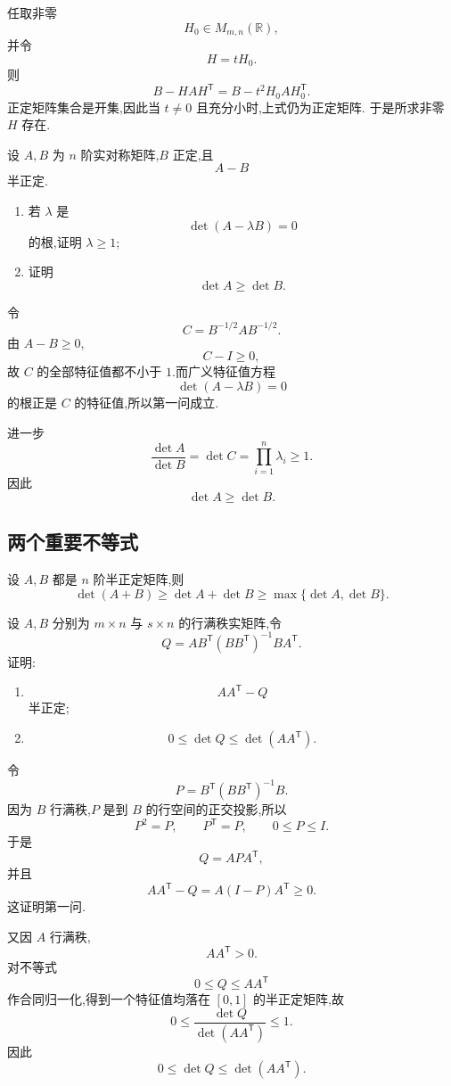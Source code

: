 \begin{solution}
任取非零
\[
H_0\in M_{m,n}(\mathbb{R}),
\]
并令
\[
H=tH_0.
\]
则
\[
B-HAH^{\mathsf T}
=
B-t^2H_0AH_0^{\mathsf T}.
\]
正定矩阵集合是开集,因此当 $t\neq0$ 且充分小时,上式仍为正定矩阵.
于是所求非零 $H$ 存在.
\end{solution}


\begin{example}
设 $A,B$ 为 $n$ 阶实对称矩阵,$B$ 正定,且
\[
A-B
\]
半正定.
\begin{enumerate}
    \item 若 $\lambda$ 是
    \[
    \det(A-\lambda B)=0
    \]
    的根,证明 $\lambda\ge1$;
    \item 证明
    \[
    \det A\ge\det B.
    \]
\end{enumerate}
\end{example}
\exampleblank

\begin{solution}
令
\[
C=B^{-1/2}AB^{-1/2}.
\]
由 $A-B\ge0$,
\[
C-I\ge0,
\]
故 $C$ 的全部特征值都不小于 $1$.而广义特征值方程
\[
\det(A-\lambda B)=0
\]
的根正是 $C$ 的特征值,所以第一问成立.

进一步
\[
\dfrac{\det A}{\det B}
=
\det C
=
\prod\limits_{i=1}^{n}\lambda_i
\ge1.
\]
因此
\[
\boxed{\det A\ge\det B}.
\]
\end{solution}


\subsection{两个重要不等式}

\begin{proposition}[\markstar]
设 $A,B$ 都是 $n$ 阶半正定矩阵,则
\[
\det(A+B)\ge\det A+\det B
\ge
\max\{\det A,\det B\}.
\]
\end{proposition}


\begin{example}
设 $A,B$ 分别为 $m\times n$ 与 $s\times n$ 的行满秩实矩阵,令
\[
Q=
AB^{\mathsf T}(BB^{\mathsf T})^{-1}BA^{\mathsf T}.
\]
证明:
\begin{enumerate}
    \item
    \[
    AA^{\mathsf T}-Q
    \]
    半正定;
    \item
    \[
    0\le\det Q\le\det(AA^{\mathsf T}).
    \]
\end{enumerate}
\end{example}
\exampleblank

\begin{solution}
令
\[
P=
B^{\mathsf T}(BB^{\mathsf T})^{-1}B.
\]
因为 $B$ 行满秩,$P$ 是到 $B$ 的行空间的正交投影,所以
\[
P^2=P,\qquad P^{\mathsf T}=P,\qquad 0\le P\le I.
\]
于是
\[
Q=APA^{\mathsf T},
\]
并且
\[
AA^{\mathsf T}-Q
=
A(I-P)A^{\mathsf T}\ge0.
\]
这证明第一问.

又因 $A$ 行满秩,
\[
AA^{\mathsf T}>0.
\]
对不等式
\[
0\le Q\le AA^{\mathsf T}
\]
作合同归一化,得到一个特征值均落在 $[0,1]$ 的半正定矩阵,故
\[
0\le
\dfrac{\det Q}{\det(AA^{\mathsf T})}
\le1.
\]
因此
\[
\boxed{
0\le\det Q\le\det(AA^{\mathsf T}).
}
\]
\end{solution}


